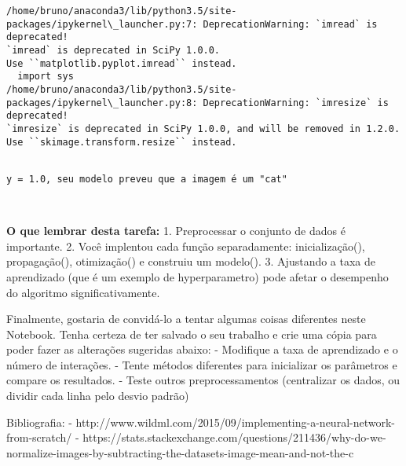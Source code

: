 \documentclass[11pt]{article}
\begin{document}
    \begin{Verbatim}[commandchars=\\\{\}]
/home/bruno/anaconda3/lib/python3.5/site-packages/ipykernel\_launcher.py:7: DeprecationWarning: `imread` is deprecated!
`imread` is deprecated in SciPy 1.0.0.
Use ``matplotlib.pyplot.imread`` instead.
  import sys
/home/bruno/anaconda3/lib/python3.5/site-packages/ipykernel\_launcher.py:8: DeprecationWarning: `imresize` is deprecated!
`imresize` is deprecated in SciPy 1.0.0, and will be removed in 1.2.0.
Use ``skimage.transform.resize`` instead.
  

    \end{Verbatim}

    \begin{Verbatim}[commandchars=\\\{\}]
y = 1.0, seu modelo preveu que a imagem é um "cat"

    \end{Verbatim}

    \begin{center}
    \end{center}
    { \hspace*{\fill} \\}
    
     \textbf{O que lembrar desta tarefa:} 1. Preprocessar o conjunto de
dados é importante. 2. Você implentou cada função separadamente:
inicialização(), propagação(), otimização() e construiu um modelo(). 3.
Ajustando a taxa de aprendizado (que é um exemplo de hyperparametro)
pode afetar o desempenho do algoritmo significativamente.

    Finalmente, gostaria de convidá-lo a tentar algumas coisas diferentes
neste Notebook. Tenha certeza de ter salvado o seu trabalho e crie uma
cópia para poder fazer as alterações sugeridas abaixo: - Modifique a
taxa de aprendizado e o número de interações. - Tente métodos diferentes
para inicializar os parâmetros e compare os resultados. - Teste outros
preprocessamentos (centralizar os dados, ou dividir cada linha pelo
desvio padrão)

    Bibliografia: -
http://www.wildml.com/2015/09/implementing-a-neural-network-from-scratch/
-
https://stats.stackexchange.com/questions/211436/why-do-we-normalize-images-by-subtracting-the-datasets-image-mean-and-not-the-c


    
    
    
    
\end{document}
